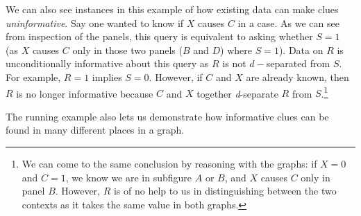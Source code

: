 \documentclass[
  12pt,
]{book}
\begin{document}
We can also see instances in this example of how existing data can make clues \emph{uninformative}. Say one wanted to know if \(X\) causes \(C\) in a case. As we can see from inspection of the panels, this query is equivalent to asking whether \(S=1\) (as \(X\) causes \(C\) only in those two panels (\(B\) and \(D\)) where \(S=1\)). Data on \(R\) is unconditionally informative about this query as \(R\) is not \(d-\)separated from \(S\). For example, \(R=1\) implies \(S=0\). However, if \(C\) and \(X\) are already known, then \(R\) is no longer informative because \(C\) and \(X\) together \emph{d}-separate \(R\) from \(S\).\footnote{We can come to the same conclusion by reasoning with the graphs: if \(X=0\) and \(C=1\), we know we are in subfigure \(A\) or \(B\), and \(X\) causes \(C\) only in panel \(B\). However, \(R\) is of no help to us in distinguishing between the two contexts as it takes the same value in both graphs.}

The running example also lets us demonstrate how informative clues can be found in many different places in a graph.
\end{document}
